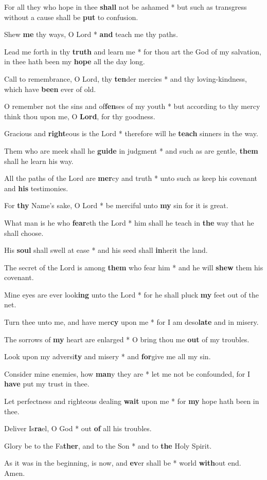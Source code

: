 \begin{multicols}{2}
	For all they who hope in thee \textbf{shall} not be ashamed * but such as transgress without a cause shall be \textbf{put} to confusion.
	
	Shew \textbf{me} thy ways, O Lord * \textbf{and} teach me thy paths.
	
	Lead me forth in thy \textbf{truth} and learn me * for thou art the God of my salvation, in thee hath been my \textbf{hope} all the day long.
	
	Call to remembrance, O Lord, thy \textbf{ten}der mercies * and thy loving-kindness, which have \textbf{been} ever of old.
	
	O remember not the sins and of\textbf{fen}ses of my youth * but according to thy mercy think thou upon me, O \textbf{Lord}, for thy goodness.
	
	Gracious and \textbf{right}eous is the Lord * therefore will he \textbf{teach} sinners in the way.
	
	Them who are meek shall he \textbf{guide} in judgment * and such as are gentle, \textbf{them} shall he learn his way.
	
	All the paths of the Lord are \textbf{mer}cy and truth * unto such as keep his covenant and \textbf{his} testimonies.
	
	For \textbf{thy} Name's sake, O Lord * be merciful unto \textbf{my} sin for it is great.
	
	What man is he who \textbf{fear}eth the Lord * him shall he teach in \textbf{the} way that he shall choose.
	
	His \textbf{soul} shall swell at ease * and his seed shall \textbf{in}herit the land.
	
	The secret of the Lord is among \textbf{them} who fear him * and he will \textbf{shew} them his covenant.
	
	Mine eyes are ever look\textbf{ing} unto the Lord * for he shall pluck \textbf{my} feet out of the net.
	
	Turn thee unto me, and have mer\textbf{cy} upon me * for I am deso\textbf{late }and in misery.
	
	The sorrows of \textbf{my} heart are enlarged * O bring thou me \textbf{out} of my troubles.
	
	Look upon my adversi\textbf{ty} and misery * and \textbf{for}give me all my sin.
	
	Consider mine enemies, how \textbf{man}y they are * let me not be confounded, for I \textbf{have} put my trust in thee.
	
	Let perfectness and righteous dealing \textbf{wait} upon me * for \textbf{my} hope hath been in thee.
	
	Deliver Is\textbf{ra}el, O God * out \textbf{of} all his troubles.
	
	Glory be to the Fa\textbf{ther}, and to the Son * and to \textbf{the} Holy Spirit.
	
	As it was in the beginning, is now, and \textbf{ev}er shall be * world \textbf{with}out end. Amen.
\end{multicols}